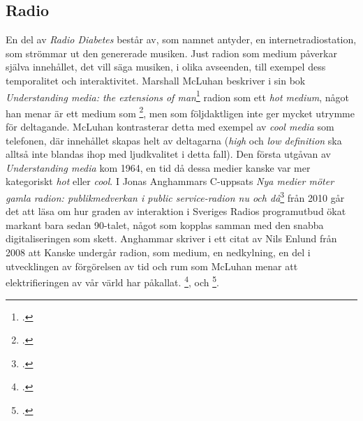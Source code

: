 \documentclass[11pt, a4paper]{article} %
\begin{document}
\subsection*{Radio}
En del av \emph{Radio Diabetes} består av, som namnet antyder, en internetradiostation, som strömmar ut den genererade musiken. Just radion som medium påverkar själva innehållet, det vill säga musiken, i olika avseenden, till exempel dess temporalitet och interaktivitet. Marshall McLuhan beskriver i sin bok \emph{Understanding media: the extensions of man}\footcite{mcluhan_understanding_2003} radion som ett \emph{hot medium}, något han menar är ett medium som \footcite[39]{mcluhan_understanding_2003}, men som följdaktligen inte ger mycket utrymme för deltagande. McLuhan kontrasterar detta med exempel av \emph{cool media} som telefonen, där innehållet skapas helt av deltagarna (\emph{high} och \emph{low definition} ska alltså inte blandas ihop med ljudkvalitet i detta fall). Den första utgåvan av \emph{Understanding media} kom 1964, en tid då dessa medier kanske var mer kategoriskt \emph{hot} eller \emph{cool}. I Jonas Anghammars C-uppsats \emph{Nya medier möter gamla radion: publikmedverkan i public service-radion nu och då}\footcite{anghammar_nya_2010} från 2010 går det att läsa om hur graden av interaktion i Sveriges Radios programutbud ökat markant bara sedan 90-talet, något som kopplas samman med den snabba digitaliseringen som skett. Anghammar skriver i ett citat av Nils Enlund från 2008 att  Kanske undergår radion, som medium, en nedkylning, en del i utvecklingen av förgörelsen av tid och rum som McLuhan menar att elektrifieringen av vår värld har påkallat. \footcite[206]{mcluhan_understanding_2003}, och \footcite[454]{mcluhan_understanding_2003}.

\end{document}
